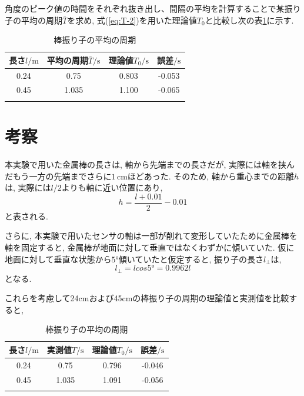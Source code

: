 \documentclass{jarticle}
\begin{document}
角度のピーク値の時間をそれぞれ抜き出し、間隔の平均を計算することで某振り子の平均の周期$\bar{T}$を求め, 式(\ref{eq:T-2})を用いた理論値$T_0$と比較し次の表\ref{tb:T}に示す.\cite{uec-atom}

\begin{table}[h]
  \centering
  \caption{棒振り子の平均の周期}
  \begin{tabular}{cccc}
    \hline
    長さ$l/\mathrm{m}$ & 平均の周期$\bar{T}/\mathrm{s}$ & 理論値$T_0/\mathrm{s}$ & 誤差$/\mathrm{s}$ \\
    \hline
    0.24 & 0.75 & 0.803 & -0.053 \\
    0.45 & 1.035 & 1.100 & -0.065 \\
    \hline
    \label{tb:T}
  \end{tabular}
\end{table}



\section{考察}

本実験で用いた金属棒の長さは, 軸から先端までの長さだが, 実際には軸を挟んだもう一方の先端までさらに$1\,\mathrm{cm}$ほどあった.
そのため, 軸から重心までの距離$h$は, 実際には$l/2$よりも軸に近い位置にあり,
\begin{equation}
  h=\frac{l+0.01}{2}-0.01
\end{equation}
と表される.

さらに, 本実験で用いたセンサの軸は一部が削れて変形していたために金属棒を軸を固定すると, 金属棒が地面に対して垂直ではなくわずかに傾いていた.
仮に地面に対して垂直な状態から$5°$傾いていたと仮定すると, 振り子の長さ$l_\perp$は,
\begin{equation}
  l_\perp=lcos5°=0.9962l
\end{equation}
となる.

これらを考慮して24cmおよび45cmの棒振り子の周期の理論値と実測値を比較すると,

\begin{table}[h]
  \centering
  \caption{棒振り子の平均の周期}
  \begin{tabular}{cccc}
    \hline
    長さ$l/\mathrm{m}$ & 実測値$T/\mathrm{s}$ & 理論値$T_0/\mathrm{s}$ & 誤差$/\mathrm{s}$ \\
    \hline
    0.24 & 0.75 & 0.796 & -0.046 \\
    0.45 & 1.035 & 1.091 & -0.056 \\
    \hline
    \label{tb:T2}
  \end{tabular}
\end{table}
\end{document}
